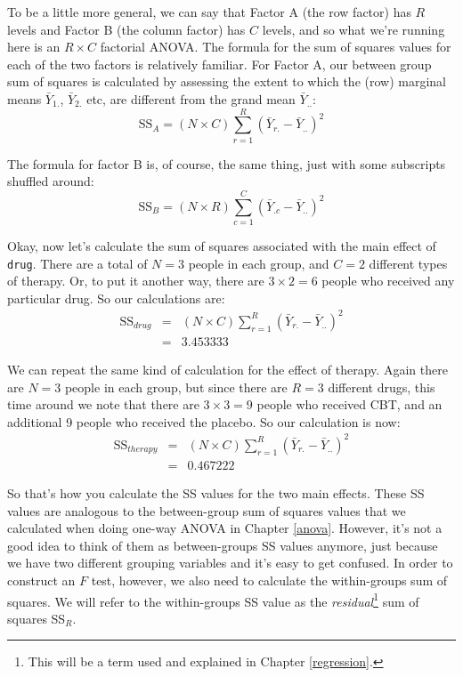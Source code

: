 \documentclass[
  11pt,
  a4paper,
  twoside,symmetric,openright]{book}
\theoremstyle{break}
\theoremstyle{break}
\begin{document}
To be a little more general, we can say that Factor A (the row factor) has \(R\) levels and Factor B (the column factor) has \(C\) levels, and so what we're running here is an \(R \times C\) factorial ANOVA. The formula for the sum of squares values for each of the two factors is relatively familiar. For Factor A, our between group sum of squares is calculated by assessing the extent to which the (row) marginal means \(\bar{Y}_{1.}\), \(\bar{Y}_{2.}\) etc, are different from the grand mean \(\bar{Y}_{..}\):
\[
\mbox{SS}_{A} = (N \times C)  \sum_{r=1}^R  \left( \bar{Y}_{r.} - \bar{Y}_{..} \right)^2
\]

The formula for factor B is, of course, the same thing, just with some subscripts shuffled around:
\[
\mbox{SS}_{B} = (N \times R) \sum_{c=1}^C \left( \bar{Y}_{.c} - \bar{Y}_{..} \right)^2
\]

Okay, now let's calculate the sum of squares associated with the main effect of \texttt{drug}. There are a total of \(N=3\) people in each group, and \(C=2\) different types of therapy. Or, to put it another way, there are \(3 \times 2 = 6\) people who received any particular drug. So our calculations are:
\[
\begin{array}{rcl}
\mbox{SS}_{drug} &=& (N \times C)  \sum_{r=1}^R  \left( \bar{Y}_{r.} - \bar{Y}_{..} \right)^2
    \\
    &=& 3.453333
\end{array}
\]

We can repeat the same kind of calculation for the effect of therapy. Again there are \(N=3\) people in each group, but since there are \(R=3\) different drugs, this time around we note that there are \(3 \times 3 = 9\) people who received CBT, and an additional 9 people who received the placebo. So our calculation is now:
\[
\begin{array}{rcl}
\mbox{SS}_{therapy} &=& (N \times C)  \sum_{r=1}^R  \left( \bar{Y}_{r.} - \bar{Y}_{..} \right)^2
    \\
    &=& 0.467222
\end{array}
\]

So that's how you calculate the SS values for the two main effects. These SS values are analogous to the between-group sum of squares values that we calculated when doing one-way ANOVA in Chapter \ref{anova}. However, it's not a good idea to think of them as between-groups SS values anymore, just because we have two different grouping variables and it's easy to get confused. In order to construct an \(F\) test, however, we also need to calculate the within-groups sum of squares. We will refer to the within-groups SS value as the \emph{residual}\footnote{This will be a term used and explained in Chapter \ref{regression}.} sum of squares SS\(_R\).
\end{document}
